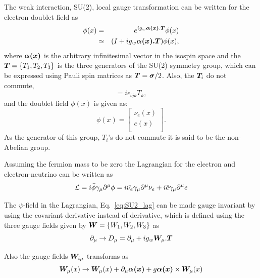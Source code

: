 The weak interaction, SU(2), local gauge transformation can be written for the electron doublet field as
\begin{eqnarray}
    \phi (x) &  = & e^{ig_w \boldsymbol{\alpha(x)} .\boldsymbol{T}} \phi(x) \nonumber \\
             &  \simeq & (I + ig_w \boldsymbol{\alpha(x)} \boldsymbol{.T})\phi(x),
\end{eqnarray}
where $\boldsymbol{\alpha(x)}$ is the arbitrary infinitesimal vector in the isospin space and the $\boldsymbol{T} = \{T_1,T_2,T_3\}$ is the three generators of the SU(2) symmetry group, which can be expressed using Pauli spin matrices as $\boldsymbol{T} = \boldsymbol{\sigma} / 2$. Also, the $\boldsymbol{T}_i$ do not commute,\begin{equation}
    [T_i,T_j] = i\epsilon_{ijk}T_k,
\end{equation} and the doublet field $\phi(x)$ is given as:
\begin{equation}
    \phi(x) = \begin{bmatrix}
        \nu_e(x)  \\
        e(x)  \\
        \end{bmatrix}.
\end{equation}
As the generator of this group, $T_i$'s do not commute it is said to be the non-Abelian group.

Assuming the fermion mass to be zero the Lagrangian for the electron and electron-neutrino can be written as
\begin{equation}\label{eq:SU2_lag}
    \mathcal{L} = i\bar{\phi}\gamma_{\mu}\partial^{\mu}\phi = i\bar{\nu_e}\gamma_{\mu}\partial^{\mu}\nu_e + i\bar{e}\gamma_{\mu}\partial^{\mu}e
\end{equation}

The $\psi$-field in the Lagrangian, Eq.~\ref{eq:SU2_lag} can be made gauge invariant by using the covariant derivative instead of derivative, which is defined using the three gauge fields given by $\boldsymbol{W} = \{W_1,W_2,W_3\}$ as
\begin{equation}\label{eq:su2_covarientderivative}
    \partial_{\mu} \rightarrow D_{\mu} = \partial_{\mu} + i g_w \boldsymbol{W}_{\mu}.\boldsymbol{T}
\end{equation}

Also the gauge fields $\boldsymbol{W}_{i\mu}$ transforms as
\begin{equation}\label{eq:su2_gaugefield}
    \boldsymbol{W}_{\mu}(x) \rightarrow \boldsymbol{W}_{\mu}(x) + \partial_{\mu}\boldsymbol{\alpha(x)} + g\boldsymbol{\alpha(x)} \times \boldsymbol{W}_{\mu}(x)
\end{equation}


